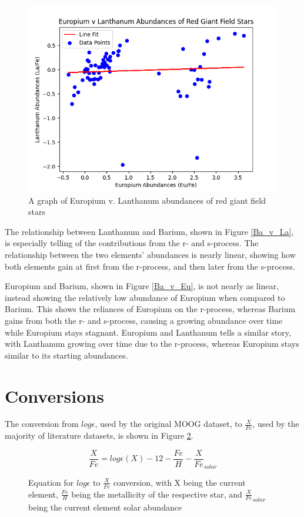 \begin{figure}[H]
  \includegraphics[width=\textwidth]{Eu_v_La.png}
  \caption{A graph of Europium v. Lanthanum abundances of red giant field stars}
  \label{Eu_v_La}
\end{figure}

The relationship between Lanthanum and Barium, shown in Figure \ref{Ba_v_La}, is especially telling of the contributions from the r- and s-process. The relationship between the two elements' abundances is nearly linear, showing how both elements gain at first from the r-process, and then later from the s-process.

Europium and Barium, shown in Figure \ref{Ba_v_Eu}, is not nearly as linear, instead showing the relatively low abundance of Europium when compared to Barium. This shows the reliances of Europium on the r-process, whereas Barium gains from both the r- and s-process, causing a growing abundance over time while Europium stays stagnant. Europium and Lanthanum tells a similar story, with Lanthanum growing over time due to the r-process, whereas Europium stays similar to its starting abundances.

\section{Conversions}

The conversion from $log\epsilon$, used by the original MOOG dataset, to $\frac{X}{Fe}$, used by the majority of literature datasets, is shown in Figure \ref{eq:conversion}.

\begin{figure}[H]
  \[\frac{X}{Fe} = log\epsilon(X) - 12 - \frac{Fe}{H} - \frac{X}{Fe}_{solar} \]
  \caption{Equation for $log\epsilon$ to $\frac{X}{Fe}$ conversion, with X being the current element, $\frac{Fe}{H}$ being the metallicity of the respective star, and $\frac{X}{Fe}_{solar}$ being the current element solar abundance}
  \label{eq:conversion}
\end{figure}

